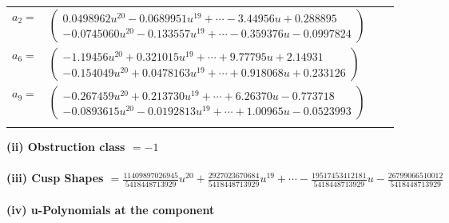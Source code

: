 \documentclass[1p]{elsarticle_modified}
\theoremstyle{definition}
\begin{document}
\begin{tabular}{m{7pt} m{180pt} m{7pt} m{180pt} }
\flushright $a_{2}=$&$\begin{pmatrix}0.0498962 u^{20}-0.0689951 u^{19}+\cdots-3.44956 u+0.288895\\-0.0745060 u^{20}-0.133557 u^{19}+\cdots-0.359376 u-0.0997824\end{pmatrix}$ \\
\flushright $a_{6}=$&$\begin{pmatrix}-1.19456 u^{20}+0.321015 u^{19}+\cdots+9.77795 u+2.14931\\-0.154049 u^{20}+0.0478163 u^{19}+\cdots+0.918068 u+0.233126\end{pmatrix}$ \\
\flushright $a_{9}=$&$\begin{pmatrix}-0.267459 u^{20}+0.213730 u^{19}+\cdots+6.26370 u-0.773718\\-0.0893615 u^{20}-0.0192813 u^{19}+\cdots+1.00965 u-0.0523993\end{pmatrix}$\\&\end{tabular}
\flushleft \textbf{(ii) Obstruction class $= -1$}\\~\\
\flushleft \textbf{(iii) Cusp Shapes $= \frac{11409897026945}{5418448713929} u^{20}+\frac{2927023670684}{5418448713929} u^{19}+\cdots-\frac{19517453412181}{5418448713929} u-\frac{26799066510012}{5418448713929}$}\\~\\
\newpage\renewcommand{\arraystretch}{1}
\flushleft \textbf{(iv) u-Polynomials at the component}\newline \\
\end{document}
